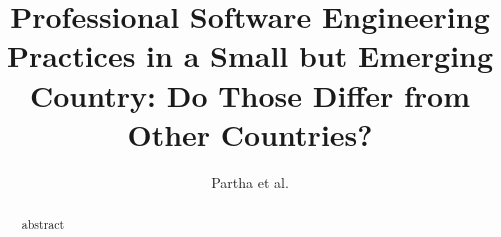 \documentclass[smallcondensed]{svjour3}       %
\newcounter{o}
\newcounter{d}
\newcounter{t}
\begin{document}
\title{Professional Software Engineering Practices in a Small but Emerging Country: Do Those Differ from Other Countries?}
\author{Partha et al.}%

\date{}
\maketitle

\sloppy

\begin{abstract}
abstract

\end{abstract}



% 
% 


% 
% 
% 

\begin{small}

%

\end{small}
\end{document}
